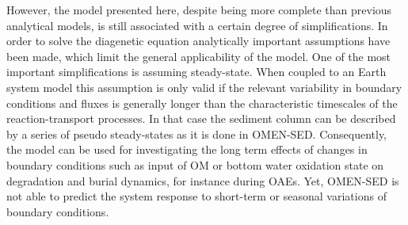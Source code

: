 \documentclass[gmd, manuscript]{copernicus}
\begin{document}
However, the model presented here, despite being more complete than previous analytical models, is still associated with a certain degree of simplifications. In order to solve the diagenetic equation analytically important assumptions have been made, which limit 
the general applicability of the model. One of the most important simplifications is assuming steady-state. 
When coupled to an Earth system model this assumption is only valid if the relevant variability in boundary conditions and fluxes is generally longer than the characteristic timescales of the reaction-transport processes. 
In that case the sediment column can be described by a series of pseudo steady-states as it is done in OMEN-SED. Consequently, the model can be used for investigating the long term effects of changes in boundary conditions such as input of OM 
or bottom water oxidation state on degradation and burial dynamics, for instance during OAEs. Yet, OMEN-SED is not able to predict the system response to short-term or seasonal variations of boundary conditions. 
\end{document}
